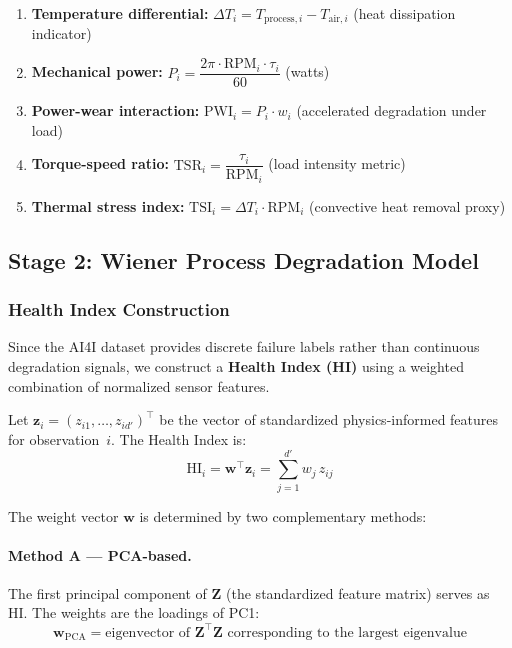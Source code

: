 \documentclass[12pt, a4paper]{article}
\newcommand{\HI}{\mathrm{HI}}
\begin{document}
\begin{enumerate}
    \item \textbf{Temperature differential:} $\Delta T_i = T_{\mathrm{process},i} - T_{\mathrm{air},i}$ \hfill (heat dissipation indicator)
    \item \textbf{Mechanical power:} $P_i = \dfrac{2\pi \cdot \mathrm{RPM}_i \cdot \tau_i}{60}$ \hfill (watts)
    \item \textbf{Power-wear interaction:} $\mathrm{PWI}_i = P_i \cdot w_i$ \hfill (accelerated degradation under load)
    \item \textbf{Torque-speed ratio:} $\mathrm{TSR}_i = \dfrac{\tau_i}{\mathrm{RPM}_i}$ \hfill (load intensity metric)
    \item \textbf{Thermal stress index:} $\mathrm{TSI}_i = \Delta T_i \cdot \mathrm{RPM}_i$ \hfill (convective heat removal proxy)
\end{enumerate}

\subsection{Stage 2: Wiener Process Degradation Model}

\subsubsection{Health Index Construction}

Since the AI4I dataset provides discrete failure labels rather than continuous degradation signals, we construct a \textbf{Health Index (HI)} using a weighted combination of normalized sensor features.

Let $\mathbf{z}_i = (z_{i1}, \ldots, z_{id'})^\top$ be the vector of standardized physics-informed features for observation~$i$. The Health Index is:
\begin{equation}\label{eq:hi}
    \HI_i = \mathbf{w}^\top \mathbf{z}_i = \sum_{j=1}^{d'} w_j\, z_{ij}
\end{equation}

The weight vector $\mathbf{w}$ is determined by two complementary methods:

\paragraph{Method A --- PCA-based.} The first principal component of $\mathbf{Z}$ (the standardized feature matrix) serves as HI. The weights are the loadings of PC1:
\begin{equation}
    \mathbf{w}_{\mathrm{PCA}} = \text{eigenvector of } \mathbf{Z}^\top\!\mathbf{Z} \text{ corresponding to the largest eigenvalue}
\end{equation}
\end{document}
